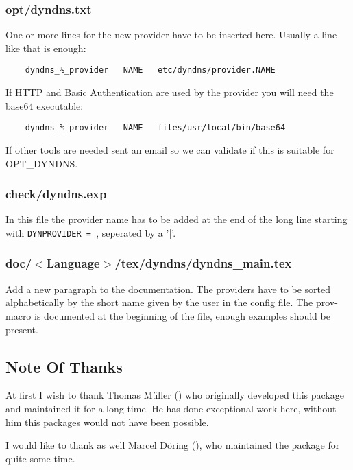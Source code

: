 \subsubsection{opt/dyndns.txt}

One or more lines for the new provider have to be inserted here.
Usually a line like that is enough:

\begin{verbatim}
	dyndns_%_provider   NAME   etc/dyndns/provider.NAME
\end{verbatim}

If HTTP and Basic Authentication are used by the provider you will 
need the base64 executable:

\begin{verbatim}
	dyndns_%_provider   NAME   files/usr/local/bin/base64
\end{verbatim}

If other tools are needed sent an email
so we can validate if this is suitable for OPT\_DYNDNS.

\subsubsection{check/dyndns.exp}

In this file the provider name has to be added at the end of the 
long line starting with \texttt{DYNPROVIDER = }, seperated by a '|'.

\subsubsection{doc/$<$Language$>$/tex/dyndns/dyndns\_main.tex}

Add a new paragraph to the documentation. The providers have to be sorted 
alphabetically by the short name given by the user in the config file. The 
prov-macro is documented at the beginning of the file,
enough examples should be present.

\subsection{Note Of Thanks}

At first I wish to thank Thomas Müller () 
who originally developed this package and maintained it for a long time.
He has done exceptional work here, without him this packages would not 
have been possible.

I would like to thank as well Marcel Döring (),
who maintained the package for quite some time.

